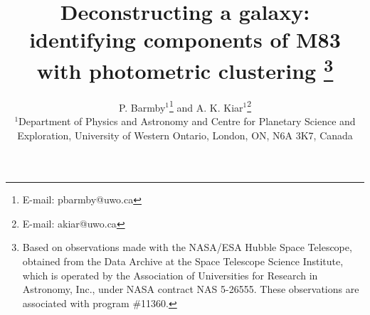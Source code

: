 \documentclass[useAMS,usenatbib]{mn2e}
\title[Deconstructing M83]{Deconstructing a galaxy: identifying components of M83 with photometric clustering%
\footnote{  
Based on observations made with the NASA/ESA Hubble Space Telescope, obtained from the Data Archive at the Space Telescope Science Institute, which is operated by the Association of Universities for Research in Astronomy, Inc., under NASA contract NAS 5-26555. These observations are associated with program \#11360.
}
}
\author[Kiar \& Barmby \& Kiar]
{
P. Barmby$^{1}$\thanks{E-mail: pbarmby@uwo.ca} and 
A. K. Kiar$^{1}$\thanks{E-mail: akiar@uwo.ca}\\
$^{1}$Department of Physics and Astronomy and Centre for Planetary Science and Exploration, University of Western Ontario, London, ON, N6A 3K7, Canada\\
}
\begin{document}
\newcommand \aaj {A\&A}

\newcommand \aarv {A\&ARv}%

\newcommand \aas{A\&AS}%
\newcommand \afz {Afz}%
\newcommand \aj {AJ}%

\newcommand \apss {Ap\&SS}%

\newcommand \apj {ApJ}

\newcommand \apjs {ApJS}%

\newcommand \araa {ARA\&A} %

\newcommand \asp {ASP Conf. Ser.}%

\newcommand \azh {Azh}%

\newcommand \baas {BAAS}%

\newcommand \mem {Mem. RAS}%

\newcommand \mnassa {MNASSA}%

\newcommand \mnras {MNRAS} %

\newcommand \pasj {PASJ}%

\newcommand \pasp {PASP}%

\newcommand \qjras {QJRAS}%

\newcommand \mex {Rev. Mex. Astron. Astrofis.}%


\newcommand \sva {SvA}%

\newcommand \aap {APP} %

\newcommand \apjl {ApJL} %
\date{}


\maketitle
\label{firstpage}
\end{document}
